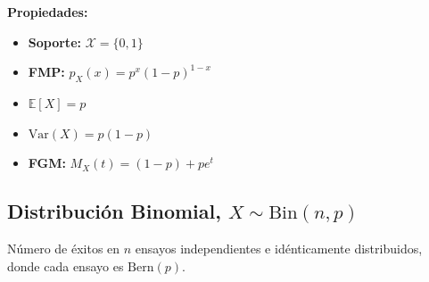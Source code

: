 \vspace{0.8em}
\noindent
\begin{minipage}[c]{0.45\textwidth}
    \textbf{Propiedades:}
    \begin{itemize}\setlength\itemsep{0.3em}
        \item \textbf{Soporte:} $\mathcal{X} = \{0, 1\}$
        \item \textbf{FMP:} $p_X(x) = p^x (1-p)^{1-x}$
        \item $\mathbb{E}[X] = p$
        \item $\text{Var}(X) = p(1-p)$
        \item \textbf{FGM:} $M_X(t) = (1-p) + p e^t$
    \end{itemize}
\end{minipage}%
\hfill
\begin{minipage}[c]{0.5\textwidth}
    \begin{center}
    \end{center}
\end{minipage}

\vspace{1.5em}

\subsection*{Distribución Binomial, $X \sim \text{Bin}(n, p)$}
Número de éxitos en $n$ ensayos independientes e idénticamente distribuidos, donde cada ensayo es $\text{Bern}(p)$.

